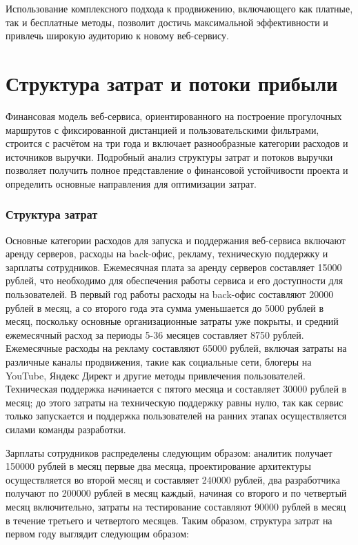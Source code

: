 Использование комплексного подхода к продвижению, включающего как платные, так и бесплатные методы, позволит достичь максимальной эффективности и привлечь широкую аудиторию к новому веб-сервису.


\section{Структура затрат и потоки прибыли}

Финансовая модель веб-сервиса, ориентированного на построение прогулочных маршрутов с фиксированной дистанцией и пользовательскими фильтрами, строится с расчётом на три года и включает разнообразные категории расходов и источников выручки. Подробный анализ структуры затрат и потоков выручки позволяет получить полное представление о финансовой устойчивости проекта и определить основные направления для оптимизации затрат.

\subsubsection{Структура затрат}

Основные категории расходов для запуска и поддержания веб-сервиса включают аренду серверов, расходы на back-офис, рекламу, техническую поддержку и зарплаты сотрудников. Ежемесячная плата за аренду серверов составляет 15000 рублей, что необходимо для обеспечения работы сервиса и его доступности для пользователей. В первый год работы расходы на back-офис составляют 20000 рублей в месяц, а со второго года эта сумма уменьшается до 5000 рублей в месяц, поскольку основные организационные затраты уже покрыты, и средний ежемесячный расход за периоды 5-36 месяцев составляет 8750 рублей. Ежемесячные расходы на рекламу составляют 65000 рублей, включая затраты на различные каналы продвижения, такие как социальные сети, блогеры на YouTube, Яндекс Директ и другие методы привлечения пользователей. Техническая поддержка начинается с пятого месяца и составляет 30000 рублей в месяц; до этого затраты на техническую поддержку равны нулю, так как сервис только запускается и поддержка пользователей на ранних этапах осуществляется силами команды разработки.

Зарплаты сотрудников распределены следующим образом: аналитик получает 150000 рублей в месяц первые два месяца, проектирование архитектуры осуществляется во второй месяц и составляет 240000 рублей, два разработчика получают по 200000 рублей в месяц каждый, начиная со второго и по четвертый месяц включительно, затраты на тестирование составляют 90000 рублей в месяц в течение третьего и четвертого месяцев. Таким образом, структура затрат на первом году выглядит следующим образом:

